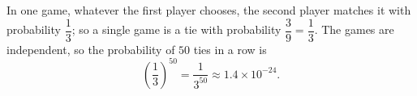In one game, whatever the first player chooses, the second player matches it with probability $\dfrac{1}{3}$; so a single game is a tie with probability $\dfrac{3}{9}=\dfrac{1}{3}$. The games are independent, so the probability of $50$ ties in a row is
\[
\boxed{\left(\dfrac{1}{3}\right)^{50}=\dfrac{1}{3^{50}}}\approx 1.4\times10^{-24}.
\]
